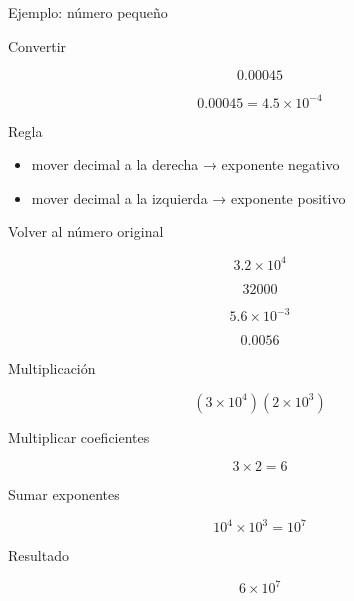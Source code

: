 \documentclass[aspectratio=169,10pt,handout]{beamer}
\newcommand{\pp}{\pause}
\begin{document}
	\begin{frame}{Ejemplo: número pequeño}
		
		Convertir
		
		\[
		0.00045
		\]
		
		\pp
		
		\[
		0.00045 = 4.5 \times 10^{-4}
		\]
		
		\pp
		
		\begin{block}{Regla}
			
			\begin{itemize}
				
				\item mover decimal a la derecha → exponente negativo
				
				\item mover decimal a la izquierda → exponente positivo
				
			\end{itemize}
			
		\end{block}
		
	\end{frame}
	
	\begin{frame}{Volver al número original}
		
		\[
		3.2 \times 10^4
		\]
		
		\pp
		
		\[
		32000
		\]
		
		\pp
		
		\[
		5.6 \times 10^{-3}
		\]
		
		\pp
		
		\[
		0.0056
		\]
		
	\end{frame}
	
	\begin{frame}{Multiplicación}
		
		\[
		(3 \times 10^4)(2 \times 10^3)
		\]
		
		\pp
		
		Multiplicar coeficientes
		
		\[
		3 \times 2 = 6
		\]
		
		\pp
		
		Sumar exponentes
		
		\[
		10^4 \times 10^3 = 10^7
		\]
		
		\pp
		
		Resultado
		
		\[
		6 \times 10^7
		\]
		
	\end{frame}
	
\end{document}
